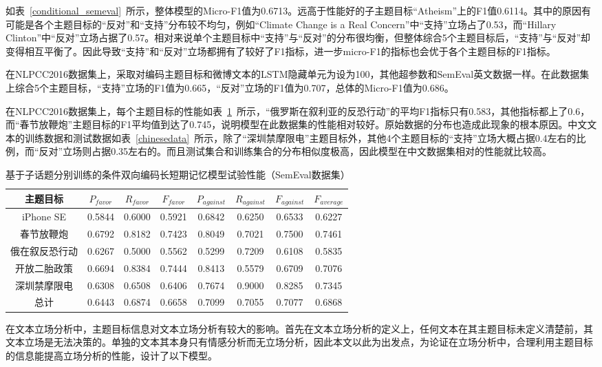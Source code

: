 如表~\ref{conditional_semeval}~所示，整体模型的Micro-F1值为0.6713。远高于性能好的子主题目标“Atheism”上的F1值0.6114。其中的原因有可能是各个主题目标的“反对”和“支持”分布较不均匀，例如“Climate Change is a Real Concern”中“支持”立场占了0.53，而“Hillary Clinton”中“反对”立场占据了0.57。相对来说单个主题目标中“支持”与“反对”的分布很均衡，但整体综合5个主题目标后，“支持”与“反对”却变得相互平衡了。因此导致“支持”和“反对”立场都拥有了较好了F1指标，进一步micro-F1的指标也会优于各个主题目标的F1指标。

在NLPCC2016数据集上，采取对编码主题目标和微博文本的LSTM隐藏单元为设为100，其他超参数和SemEval英文数据一样。在此数据集上综合5个主题目标，“支持”立场的F1值为0.665，“反对”立场的F1值为0.707，总体的Micro-F1值为0.686。

在NLPCC2016数据集上，每个主题目标的性能如表~\ref{chinese_condition}~所示，“俄罗斯在叙利亚的反恐行动”的平均F1指标只有0.583，其他指标都上了0.6，而“春节放鞭炮”主题目标的F1平均值到达了0.745，说明模型在此数据集的性能相对较好。原始数据的分布也造成此现象的根本原因。中文文本的训练数据和测试数据如表~\ref{chinesedata}~所示，除了“深圳禁摩限电”主题目标外，其他4个主题目标的“支持”立场大概占据0.4左右的比例，而“反对”立场则占据0.35左右的。而且测试集合和训练集合的分布相似度极高，因此模型在中文数据集相对的性能就比较高。
\begin{table}[htbp]
	\caption[table123]{基于子话题分别训练的条件双向编码长短期记忆模型试验性能（SemEval数据集）}
	\label{chinese_condition}
	\vspace{0.5em}\centering\wuhao
	\begin{tabular}{cccccccc}
		\toprule[1.5pt]
	主题目标& $P_{favor}$&$R_{favor}$&$F_{favor}$&$P_{against}$&$R_{against}$&$F_{against}$&$F_{average}$ \\
		\midrule[1pt]
		iPhone SE&0.5844&0.6000&0.5921&0.6842&0.6250&0.6533&0.6227\\
		春节放鞭炮&0.6792&0.8182&0.7423&0.8049&0.7021&0.7500&0.7461\\
		俄在叙反恐行动&0.6267&0.5000&0.5562&0.5299&0.7209&0.6108&0.5835\\
		开放二胎政策&0.6694&0.8384&0.7444&0.8413&0.5579&0.6709&0.7076\\
		深圳禁摩限电&0.6308&0.6508&0.6406&0.7674&0.9000&0.8285&0.7345\\
		总计&0.6443&0.6874&0.6658&0.7099&0.7055&0.7077&0.6868\\
		\bottomrule[1.5pt]
	\end{tabular}
\end{table}

在文本立场分析中，主题目标信息对文本立场分析有较大的影响。首先在文本立场分析的定义上，任何文本在其主题目标未定义清楚前，其文本立场是无法决策的。单独的文本其本身只有情感分析而无立场分析，因此本文以此为出发点，为论证在立场分析中，合理利用主题目标的信息能提高立场分析的性能，设计了以下模型。

